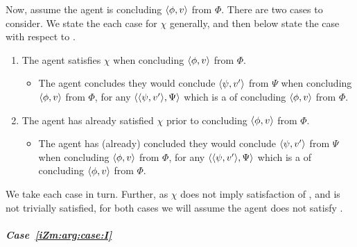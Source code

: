 \begin{note}
  Now, assume the agent is concluding \(\langle \phi, v \rangle\) from \(\Phi\).
  There are two cases to consider.
  We state the each case for \(\chi\) generally, and then below state the case with respect to \iZSm{}.
  \begin{enumerate}[label=\Roman*., ref=\Roman*]
  \item
    \label{iZm:arg:case:I}
    The agent satisfies \(\chi\) when concluding \(\langle \phi, v \rangle\) from \(\Phi\).
    \begin{itemize}
    \item
      The agent concludes they would conclude \(\langle \psi, v' \rangle\) from \(\Psi\) when concluding \(\langle \phi, v \rangle\) from \(\Phi\), for any \(\langle \langle \psi, v' \rangle, \Psi \rangle\) which is a \requ{} of concluding \(\langle \phi, v \rangle\) from \(\Phi\).
    \end{itemize}
  \item
    \label{iZm:arg:case:II}
    The agent has already satisfied \(\chi\) prior to concluding \(\langle \phi, v \rangle\) from \(\Phi\).
    \begin{itemize}
    \item
      The agent has (already) concluded they would conclude \(\langle \psi, v' \rangle\) from \(\Psi\) when concluding \(\langle \phi, v \rangle\) from \(\Phi\), for any \(\langle \langle \psi, v' \rangle, \Psi \rangle\) which is a \requ{} of concluding \(\langle \phi, v \rangle\) from \(\Phi\).
    \end{itemize}
  \end{enumerate}

  We take each case in turn.
  Further, as \(\chi\) does not imply satisfaction of \iZS{}, and \iZS{} is not trivially satisfied, for both cases we will assume the agent does not satisfy \iZS{}.
\end{note}

\subparagraph*{Case~\ref{iZm:arg:case:I}}

